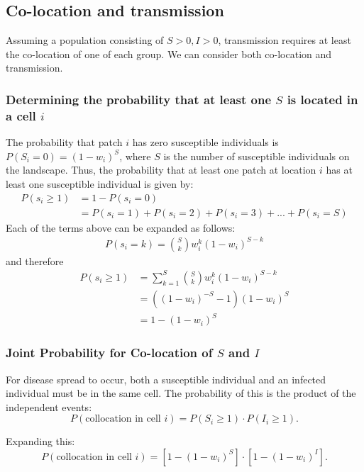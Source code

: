 \subsection{Co-location and transmission}

Assuming a population consisting of $S>0, I>0$, transmission requires at least the co-location of one of each group. We can consider both co-location and transmission.

\subsubsection{Determining the probability that at least one $S$ is located in a cell $i$}

The probability that patch $i$ has zero susceptible individuals is $P(S_{i}=0)=(1-w_{i})^S$, where $S$ is the number of susceptible individuals on the landscape. Thus, the probability that at least one patch at location $i$ has at least one susceptible individual is given by:  
\begin{align}
P(s_{i} \geq 1) &=1-P(s_{i}=0) \\
&=P(s_{i}=1)+P(s_{i}=2)+P(s_{i}=3)+ ... +P(s_{i}=S)
\end{align}
Each of the terms above can be expanded as follows: 
\begin{align}
P(s_{i}=k)=\binom{S}{k}w_{i}^k(1-w_{i})^{S-k}
\end{align}
and therefore
\begin{align}
P(s_{i} \geq 1)&=\sum_{k=1}^{S}\binom{S}{k}w_{i}^k(1-w_{i})^{S-k}\\
&=\left((1-w_{i})^{-S}-1\right)(1-w_{i})^S\\
&=1-(1-w_{i})^S
\end{align}

\subsubsection{Joint Probability for Co-location of $S$ and $I$}
For disease spread to occur, both a susceptible individual and an infected individual must be in the same cell. The probability of this is the product of the independent events:
\begin{equation}
P(\text{collocation in cell } i) = P(S_{i} \geq 1) \cdot P(I_{i} \geq 1).
\end{equation}

Expanding this:
\begin{equation}
P(\text{collocation in cell } i) = \left[ 1 - (1 - w_{i})^S \right] \cdot \left[ 1 - (1 - w_{i})^I \right].
\end{equation}


